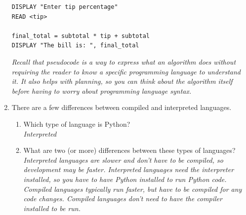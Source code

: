 \documentclass[letter,10pt]{article}
\begin{document}
\begin{enumerate}
\begin{verbatim}
DISPLAY "Enter tip percentage"
READ <tip>

final_total = subtotal * tip + subtotal
DISPLAY "The bill is: ", final_total
    \end{verbatim}
    
    \textit{Recall that pseudocode is a way to express what an algorithm does without requiring the reader to know a specific programming language to understand it. It also helps with planning, so you can think about the algorithm itself before having to worry about programming language syntax.}
    
    \item There are a few differences between compiled and interpreted languages.
    \begin{enumerate}
    	\item Which type of language is Python? \\
			\textit{Interpreted}
		\item What are two (or more) differences between these types of languages? \\
			\textit{Interpreted languages are slower and don't have to be compiled, so development may be faster. Interpreted languages need the interpreter installed, so you have to have Python installed to run Python code.} \\
			\textit{Compiled languages typically run faster, but have to be compiled for any code changes. Compiled languages don't need to have the compiler installed to be run.}
    \end{enumerate}
\end{enumerate}
\end{document}
